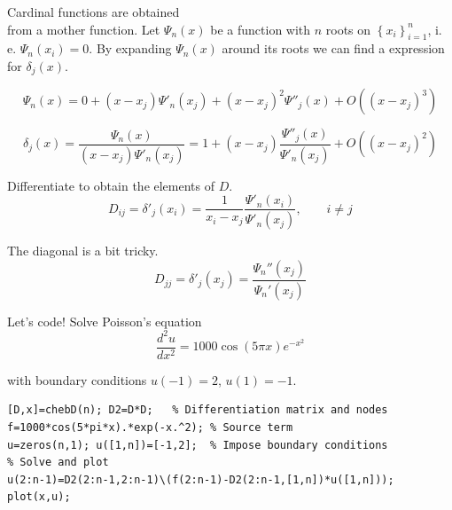 \documentclass{beamer}
\begin{document}
\begin{frame}{Cardinal functions are obtained\\from a mother function.}{}
Let $\Psi_n(x)$ be a function with $n$ roots on $\left\{x_i\right\}_{i=1}^n$, i. e. $\Psi_n(x_i)=0$.  By expanding $\Psi_n(x)$ around its roots we can find a expression for $\delta_j(x)$.

\begin{equation*}
\Psi_n(x)=0+(x-x_j)\Psi'_n(x_j)+(x-x_j)^2\Psi''_j(x)+O((x-x_j)^3)
\end{equation*}

\begin{equation*}
\delta_j(x)=\frac{\Psi_n(x)}{(x-x_j)\Psi'_n(x_j)}=1+(x-x_j)\frac{\Psi''_j(x)}{\Psi'_n(x_j)}+O((x-x_j)^2)
\end{equation*}
\end{frame}

\begin{frame}{Differentiate to obtain the elements of $D$.}{}
\begin{equation*}
D_{ij}=\delta'_j(x_i)=\frac{1}{x_i-x_j}\frac{\Psi'_n(x_i)}{\Psi'_n(x_j)}, \qquad i\neq j
\end{equation*}

\bigskip
The diagonal is a bit tricky.
\begin{equation*}
D_{jj}=\delta'_j(x_j)=\frac{\Psi_n''(x_j)}{\Psi_n'(x_j)}
\end{equation*}
\end{frame}

\begin{frame}[fragile]{Let's code!}{}
Solve Poisson's equation
\begin{equation*}
\frac{d^2u}{dx^2}=1000\cos(5\pi x)e^{-x^2}
\end{equation*}

with boundary conditions $u(-1)=2$, $u(1)=-1$.

\begin{lstlisting}
[D,x]=chebD(n); D2=D*D;   % Differentiation matrix and nodes
f=1000*cos(5*pi*x).*exp(-x.^2); % Source term
u=zeros(n,1); u([1,n])=[-1,2];  % Impose boundary conditions
% Solve and plot
u(2:n-1)=D2(2:n-1,2:n-1)\(f(2:n-1)-D2(2:n-1,[1,n])*u([1,n]));
plot(x,u);
\end{lstlisting}
\end{frame}
\end{document}
